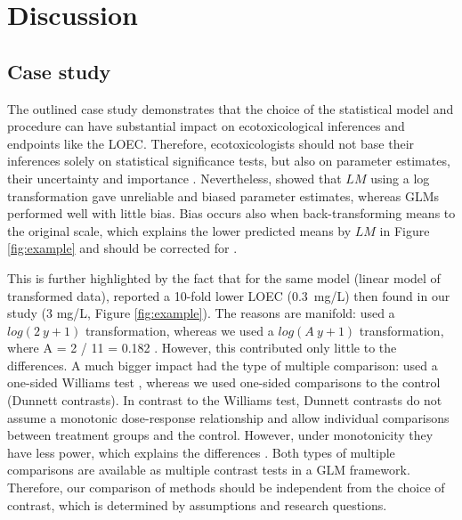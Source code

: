 \documentclass[twocolumn, natbib]{svjour3}
\begin{document}
\section{Discussion}
\label{sec:disc}
\subsection{Case study}
The outlined case study demonstrates that the choice of the statistical model and procedure can have substantial impact on ecotoxicological inferences and endpoints like the LOEC.
Therefore, ecotoxicologists should not base their inferences solely on statistical significance tests, but also on parameter estimates, their uncertainty and importance \citep{gelman_difference_2006}.
Nevertheless, \citet{ohara_not_2010} showed that $LM$ using a log transformation gave unreliable and biased parameter estimates, whereas GLMs performed well with little bias.
Bias occurs also when back-transforming means to the original scale, which explains the lower predicted means by $LM$ in Figure \ref{fig:example} \citep{rothery_cautionary_1988} and should be corrected for \citep{newman_regression_1993}.

This is further highlighted by the fact that for the same model (linear model of transformed data), \citet{brock_minimum_2015} reported a 10-fold lower LOEC (\mbox{0.3 mg/L}) then found in our study (3 mg/L, Figure \ref{fig:example}).
The reasons are manifold: \citep{brock_minimum_2015} used a $log(2~y + 1)$ transformation, whereas we used a $log(A~y + 1)$ transformation, where A = 2 / 11 = 0.182 \citep{van_den_brink_impact_2000}.
However, this contributed only little to the differences.
A much bigger impact had the type of multiple comparison: \citet{brock_minimum_2015} used a one-sided Williams test \citep{williams_comparison_1972}, whereas we used one-sided comparisons to the control (Dunnett contrasts).
In contrast to the Williams test, Dunnett contrasts do not assume a monotonic dose-response relationship and allow individual comparisons between treatment groups and the control.
However, under monotonicity they have less power, which explains the differences \citep{jaki_statistical_2013}.
Both types of multiple comparisons are available as multiple contrast tests in a GLM framework.
Therefore, our comparison of methods should be independent from the choice of contrast, which is determined by assumptions and research questions. 
 
\end{document}
